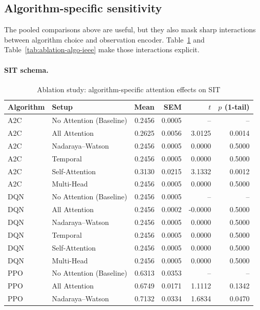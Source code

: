 \documentclass[12pt,oneside]{book}
\begin{document}
\subsection{Algorithm-specific sensitivity}

The pooled comparisons above are useful, but they also mask sharp interactions between algorithm choice and observation encoder. Table~\ref{tab:ablation-algo-sit} and Table~\ref{tab:ablation-algo-ieee} make those interactions explicit.

\paragraph{SIT schema.}

\begin{table}[htbp]
\centering
\caption{Ablation study: algorithm-specific attention effects on SIT}
\label{tab:ablation-algo-sit}
\begin{tabular}{l l r r r r}
\toprule
\textbf{Algorithm} & \textbf{Setup} & \textbf{Mean} & \textbf{SEM} & \textbf{$t$} & \textbf{$p$ (1-tail)} \\
\midrule
A2C & No Attention (Baseline) & 0.2456 & 0.0005 & -- & -- \\
A2C & All Attention & 0.2625 & 0.0056 & 3.0125 & 0.0014 \\
A2C & Nadaraya--Watson & 0.2456 & 0.0005 & 0.0000 & 0.5000 \\
A2C & Temporal & 0.2456 & 0.0005 & 0.0000 & 0.5000 \\
A2C & Self-Attention & 0.3130 & 0.0215 & 3.1332 & 0.0012 \\
A2C & Multi-Head & 0.2456 & 0.0005 & 0.0000 & 0.5000 \\
DQN & No Attention (Baseline) & 0.2456 & 0.0005 & -- & -- \\
DQN & All Attention & 0.2456 & 0.0002 & -0.0000 & 0.5000 \\
DQN & Nadaraya--Watson & 0.2456 & 0.0005 & 0.0000 & 0.5000 \\
DQN & Temporal & 0.2456 & 0.0005 & 0.0000 & 0.5000 \\
DQN & Self-Attention & 0.2456 & 0.0005 & 0.0000 & 0.5000 \\
DQN & Multi-Head & 0.2456 & 0.0005 & 0.0000 & 0.5000 \\
PPO & No Attention (Baseline) & 0.6313 & 0.0353 & -- & -- \\
PPO & All Attention & 0.6749 & 0.0171 & 1.1112 & 0.1342 \\
PPO & Nadaraya--Watson & 0.7132 & 0.0334 & 1.6834 & 0.0470 \\

\end{tabular}
\end{table}
\end{document}
